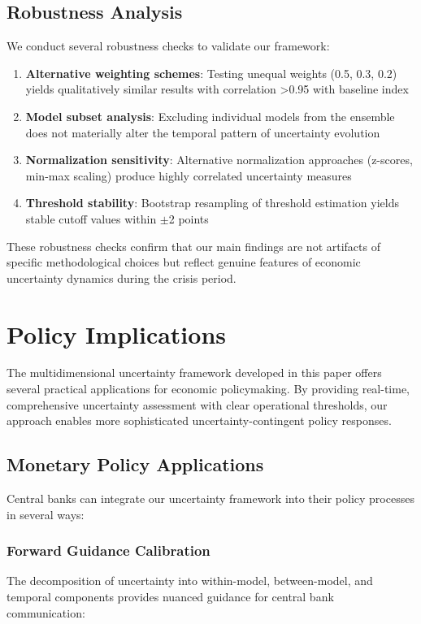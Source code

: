 \documentclass[5p,authoryear]{elsarticle}
\begin{document}
\subsection{Robustness Analysis}

We conduct several robustness checks to validate our framework:

\begin{enumerate}
    \item \textbf{Alternative weighting schemes}: Testing unequal weights (0.5, 0.3, 0.2) yields qualitatively similar results with correlation >0.95 with baseline index
    \item \textbf{Model subset analysis}: Excluding individual models from the ensemble does not materially alter the temporal pattern of uncertainty evolution
    \item \textbf{Normalization sensitivity}: Alternative normalization approaches (z-scores, min-max scaling) produce highly correlated uncertainty measures
    \item \textbf{Threshold stability}: Bootstrap resampling of threshold estimation yields stable cutoff values within $\pm$2 points
\end{enumerate}

These robustness checks confirm that our main findings are not artifacts of specific methodological choices but reflect genuine features of economic uncertainty dynamics during the crisis period.

\section{Policy Implications}

The multidimensional uncertainty framework developed in this paper offers several practical applications for economic policymaking. By providing real-time, comprehensive uncertainty assessment with clear operational thresholds, our approach enables more sophisticated uncertainty-contingent policy responses.

\subsection{Monetary Policy Applications}

Central banks can integrate our uncertainty framework into their policy processes in several ways:

\subsubsection{Forward Guidance Calibration}
The decomposition of uncertainty into within-model, between-model, and temporal components provides nuanced guidance for central bank communication:
\end{document}
